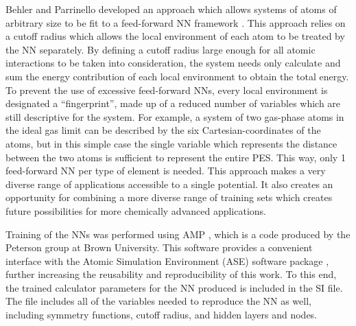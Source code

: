 \documentclass[12pt]{cmuthesis}
\begin{document}
Behler and Parrinello developed an approach which allows systems of atoms of arbitrary size to be fit to a feed-forward NN framework \cite{behler-2007-gener-neural}. This approach relies on a cutoff radius which allows the local environment of each atom to be treated by the NN separately. By defining a cutoff radius large enough for all atomic interactions to be taken into consideration, the system needs only calculate and sum the energy contribution of each local environment to obtain the total energy. To prevent the use of excessive feed-forward NNs, every local environment is designated a ``fingerprint'', made up of a reduced number of variables which are still descriptive for the system. For example, a system of two gas-phase atoms in the ideal gas limit can be described by the six Cartesian-coordinates of the atoms, but in this simple case the single variable which represents the distance between the two atoms is sufficient to represent the entire PES. This way, only 1 feed-forward NN per type of element is needed. This approach makes a very diverse range of applications accessible to a single potential. It also creates an opportunity for combining a more diverse range of training sets which creates future possibilities for more chemically advanced applications.

Training of the NNs was performed using AMP \cite{khorshidi-2016-amp}, which is a code produced by the Peterson group at Brown University. This software provides a convenient interface with the Atomic Simulation Environment (ASE) software package \cite{bahn-2002-objec-orien}, further increasing the reusability and reproducibility of this work. To this end, the trained calculator parameters for the NN produced is included in the SI file. The file includes all of the variables needed to reproduce the NN as well, including symmetry functions, cutoff radius, and hidden layers and nodes.
\end{document}
